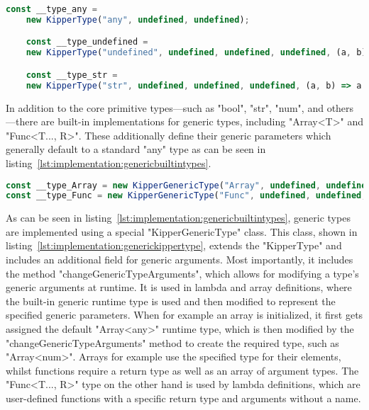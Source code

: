 \begin{lstlisting}[language=TypeScript,caption=Examples for the built-in runtime types,label=lst:implementation:builtinruntimetypes]
	const __type_any =
	new KipperType("any", undefined, undefined);

	const __type_undefined =
	new KipperType("undefined", undefined, undefined, undefined, (a, b) => a.name === b.name);

	const __type_str =
	new KipperType("str", undefined, undefined, undefined, (a, b) => a.name === b.name);
\end{lstlisting}

In addition to the core primitive types—such as "bool", "str", "num", and others—there are built-in implementations for generic types, including "Array<T>" and "Func<T..., R>". These additionally define their generic parameters which generally default to a standard "any" type as can be seen in listing~\ref{lst:implementation:genericbuiltintypes}.

\begin{lstlisting}[language=Typescript,caption=Generic built-in types,label=lst:implementation:genericbuiltintypes]
const __type_Array = new KipperGenericType("Array", undefined, undefined, {T: __type_any});
const __type_Func = new KipperGenericType("Func", undefined, undefined, {T: [], R: __type_any});
\end{lstlisting}

As can be seen in listing~\ref{lst:implementation:genericbuiltintypes}, generic types are implemented using a special "KipperGenericType" class. This class, shown in listing~\ref{lst:implementation:generickippertype}, extends the "KipperType" and includes an additional field for generic arguments. Most importantly, it includes the method "changeGenericTypeArguments", which allows for modifying a type's generic arguments at runtime. It is used in lambda and array definitions, where the built-in generic runtime type is used and then modified to represent the specified generic parameters. When for example an array is initialized, it first gets assigned the default "Array<any>" runtime type, which is then modified by the "changeGenericTypeArguments" method to create the required type, such as "Array<num>". Arrays for example use the specified type for their elements, whilst functions require a return type as well as an array of argument types. The "Func<T..., R>" type on the other hand is used by lambda definitions, which are user-defined functions with a specific return type and arguments without a name.

